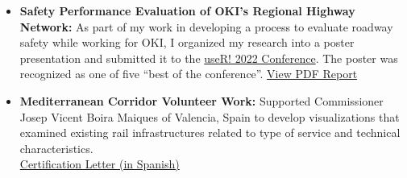 \documentclass[
  11pt,
]{article}
\begin{document}
\begin{itemize}
\item
  \textbf{Safety Performance Evaluation of OKI's Regional Highway
  Network:} As part of my work in developing a process to evaluate
  roadway safety while working for OKI, I organized my research into a
  poster presentation and submitted it to the
  \href{https://user2022.r-project.org/program/posters/}{useR! 2022
  Conference}. The poster was recognized as one of five ``best of the
  conference''.
  \href{/assets/pdfs/Roadway\%20Safety\%20Poster\%20V2.pdf}{View PDF
  Report}
\item
  \textbf{Mediterranean Corridor Volunteer Work:} Supported Commissioner
  Josep Vicent Boira Maiques of Valencia, Spain to develop
  visualizations that examined existing rail infrastructures related to
  type of service and technical characteristics.\\
  \href{/assets/pdfs/carta_peter_fortunato.pdf}{Certification Letter (in
  Spanish)}
\end{itemize}
\end{document}
